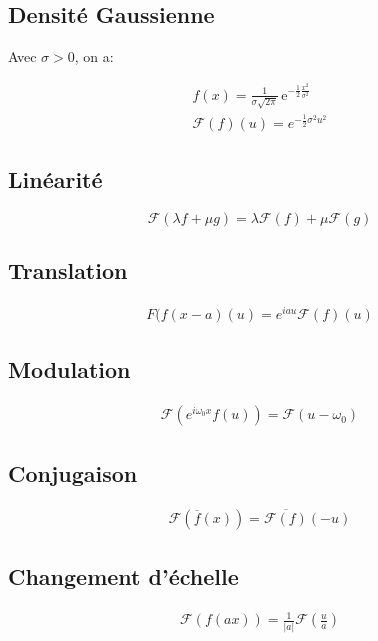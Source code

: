 \documentclass[a4paper,11pt]{article}
\begin{document}
\

\subsection{Densité Gaussienne}

Avec $\sigma > 0$, on a:

\begin{align*}
  f(x) = \frac{1}{\sigma \sqrt{2\pi}} \, \mathrm{e}^{-\frac{1}{2}\frac{x^2}{\sigma^2}}\\
  \mathcal{F}(f)(u) = e^{- \frac{1}{2} \sigma^2 u^2}
\end{align*}


\subsection{Linéarité}

$$ \mathcal{F}(\lambda f + \mu g) = \lambda \mathcal{F}(f) + \mu \mathcal{F}(g) $$

\subsection{Translation}

\begin{align*}
  F(f(x-a)(u) = e^{iau} \mathcal{F}(f)(u)
\end{align*}

\subsection{Modulation}

\begin{align*}
\mathcal{F}(e^{i\omega_0 x} f(u)) = \mathcal{F} (u - \omega_0)
\end{align*}

\subsection{Conjugaison}
\begin{align*}
  \mathcal{F}(\overline{f}(x)) = \overline{\mathcal{F}(f)}(-u)
\end{align*}

\subsection{Changement d'échelle}
\begin{align*}
  \mathcal{F}(f(ax)) = \frac{1}{|a|} \mathcal{F} \left( \frac{u}{a} \right)
\end{align*}
\end{document}
